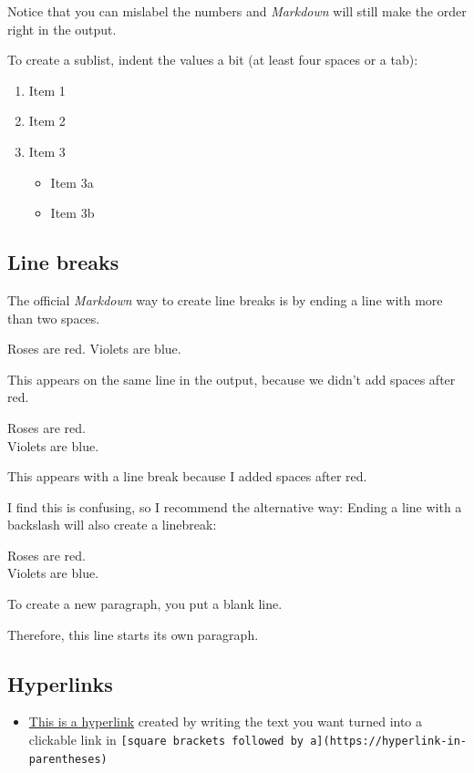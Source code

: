 \documentclass[a4paper, twoside]{templates/ociamthesis}
\providecommand{\tightlist}{%
  \setlength{\itemsep}{0pt}\setlength{\parskip}{0pt}}
\begin{document}
Notice that you can mislabel the numbers and \emph{Markdown} will still make the order right in the output.

To create a sublist, indent the values a bit (at least four spaces or a tab):

\begin{enumerate}
\def\labelenumi{\arabic{enumi}.}
\tightlist
\item
  Item 1
\item
  Item 2
\item
  Item 3

  \begin{itemize}
  \tightlist
  \item
    Item 3a
  \item
    Item 3b
  \end{itemize}
\end{enumerate}

\hypertarget{line-breaks}{%
\subsection{Line breaks}\label{line-breaks}}

The official \emph{Markdown} way to create line breaks is by ending a line with more than two spaces.

Roses are red.
Violets are blue.

This appears on the same line in the output, because we didn't add spaces after red.

Roses are red.\\
Violets are blue.

This appears with a line break because I added spaces after red.

I find this is confusing, so I recommend the alternative way: Ending a line with a backslash will also create a linebreak:

Roses are red.\\
Violets are blue.

To create a new paragraph, you put a blank line.

Therefore, this line starts its own paragraph.

\hypertarget{hyperlinks}{%
\subsection{Hyperlinks}\label{hyperlinks}}

\begin{itemize}
\tightlist
\item
  \href{https://www.google.com}{This is a hyperlink} created by writing the text you want turned into a clickable link in \texttt{{[}square\ brackets\ followed\ by\ a{]}(https://hyperlink-in-parentheses)}
\end{itemize}
\end{document}
